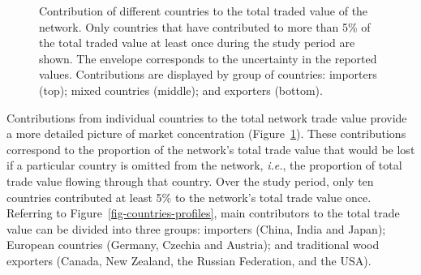 \documentclass[
  authoryear,
  review,
  3p]{elsarticle}
\begin{document}
\begin{figure}[p]


\caption{\label{fig-network-contribution}Contribution of different
countries to the total traded value of the network. Only countries that
have contributed to more than 5\% of the total traded value at least
once during the study period are shown. The envelope corresponds to the
uncertainty in the reported values. Contributions are displayed by group
of countries: importers (top); mixed countries (middle); and exporters
(bottom).}

\end{figure}%

Contributions from individual countries to the total network trade value
provide a more detailed picture of market concentration
(Figure~\ref{fig-network-contribution}). These contributions correspond
to the proportion of the network's total trade value that would be lost
if a particular country is omitted from the network, \emph{i.e.}, the
proportion of total trade value flowing through that country. Over the
study period, only ten countries contributed at least 5\% to the
network's total trade value once. Referring to
Figure~\ref{fig-countries-profiles}, main contributors to the total
trade value can be divided into three groups: importers (China, India
and Japan); European countries (Germany, Czechia and Austria); and
traditional wood exporters (Canada, New Zealand, the Russian Federation,
and the USA).
\end{document}
